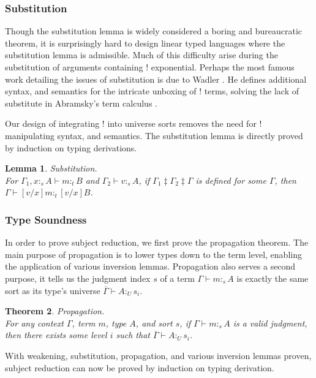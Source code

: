 \documentclass{article}
\newtheorem{theorem}{Theorem}[section]
\newtheorem{lemma}[theorem]{Lemma}
\theoremstyle{definition}
\newcommand{\utype}{:_{\scriptscriptstyle U}}
\newcommand{\stype}[1]{:_#1}
\newcommand{\mrg}[3]{#1\ddagger#2\ddagger#3}
\begin{document}
  \subsubsection{Substitution} \label{subst}
  Though the substitution lemma is widely considered a boring and bureaucratic theorem, it is surprisingly hard to design linear typed languages where the substitution lemma is admissible. Much of this difficulty arise during the substitution of arguments containing ! exponential. Perhaps the most famous work detailing the issues of substitution is due to Wadler \cite{substitute}. He defines additional syntax, and semantics for the intricate unboxing of ! terms, solving the lack of substitute in Abramsky's term calculus \cite{abramsky1993}.

  Our design of integrating ! into universe sorts removes the need for ! manipulating syntax, and semantics. The substitution lemma is directly proved by induction on typing derivations.

  \begin{lemma} Substitution. \\
    For $\Gamma_1, x \stype{s} A \vdash m \stype{t} B$ and $\Gamma_2 \vdash v \stype{s} A$, if $\mrg{\Gamma_1}{\Gamma_2}{\Gamma}$ is defined for some $\Gamma$, then $\Gamma \vdash [v/x]m \stype{t} [v/x]B$.
  \end{lemma}

  \subsubsection{Type Soundness}
  In order to prove subject reduction, we first prove the propagation theorem. The main purpose of propagation is to lower types down to the term level, enabling the application of various inversion lemmas. Propagation also serves a second purpose, it tells us the judgment index $s$ of a term $\Gamma \vdash m \stype{s} A$ is exactly the same sort as its type's universe $\overline{\Gamma} \vdash A \utype s_i$.

  \begin{theorem} Propagation. \\
     For any context $\Gamma$, term $m$, type $A$, and sort $s$, if $\Gamma \vdash m \stype{s} A$ is a valid judgment, then there exists some level $i$ such that $\overline{\Gamma} \vdash A \utype s_i$.
    \label{propagation}
  \end{theorem}

  With weakening, substitution, propagation, and various inversion lemmas proven, subject reduction can now be proved by induction on typing derivation.
\end{document}
